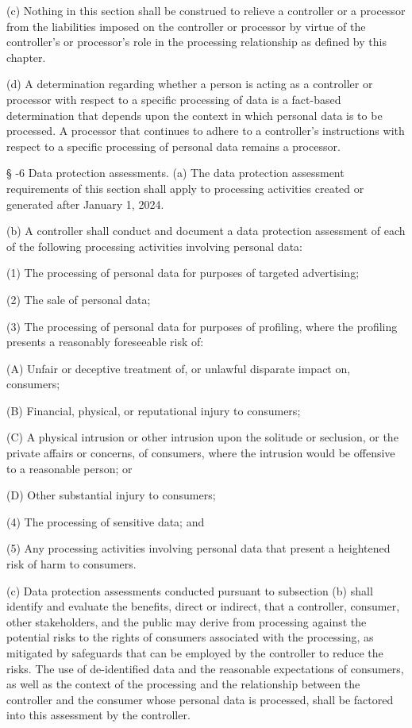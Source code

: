      (c)  Nothing in this section shall be construed to relieve a controller or a processor from the liabilities imposed on the controller or processor by virtue of the controller's or processor's role in the processing relationship as defined by this chapter.

     (d)  A determination regarding whether a person is acting as a controller or processor with respect to a specific processing of data is a fact-based determination that depends upon the context in which personal data is to be processed.  A processor that continues to adhere to a controller's instructions with respect to a specific processing of personal data remains a processor.

     §   -6  Data protection assessments.  (a)  The data protection assessment requirements of this section shall apply to processing activities created or generated after January 1, 2024.

     (b)  A controller shall conduct and document a data protection assessment of each of the following processing activities involving personal data:

     (1)  The processing of personal data for purposes of targeted advertising;

     (2)  The sale of personal data;

     (3)  The processing of personal data for purposes of profiling, where the profiling presents a reasonably foreseeable risk of:

          (A)  Unfair or deceptive treatment of, or unlawful disparate impact on, consumers;

          (B)  Financial, physical, or reputational injury to consumers;

          (C)  A physical intrusion or other intrusion upon the solitude or seclusion, or the private affairs or concerns, of consumers, where the intrusion would be offensive to a reasonable person; or

          (D)  Other substantial injury to consumers;

     (4)  The processing of sensitive data; and

     (5)  Any processing activities involving personal data that present a heightened risk of harm to consumers.

     (c)  Data protection assessments conducted pursuant to subsection (b) shall identify and evaluate the benefits, direct or indirect, that a controller, consumer, other stakeholders, and the public may derive from processing against the potential risks to the rights of consumers associated with the processing, as mitigated by safeguards that can be employed by the controller to reduce the risks.  The use of de-identified data and the reasonable expectations of consumers, as well as the context of the processing and the relationship between the controller and the consumer whose personal data is processed, shall be factored into this assessment by the controller.

